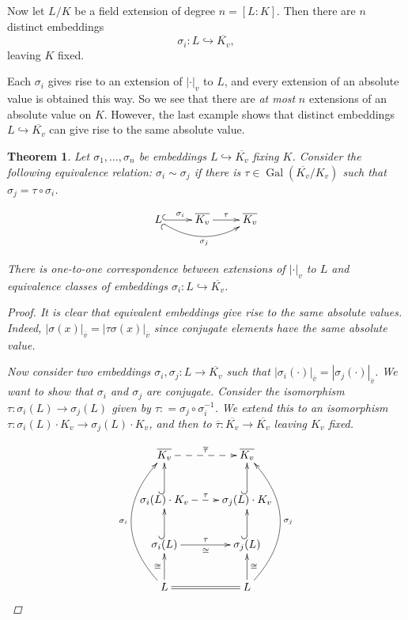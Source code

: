 \documentclass{article}
\newcommand{\isom}{\cong}
\newcommand{\dfn}{\mathrel{\mathop:}=}
\DeclareMathOperator{\Gal}{Gal}
\theoremstyle{myplain}
\newtheorem{theorem}[proposition]{Theorem}
\theoremstyle{mydefinition}
\begin{document}
Now let $L/K$ be a field extension of degree $n = [L:K]$. Then there are $n$
distinct embeddings
$$\sigma_i\colon L \hookrightarrow \overline{K_v},$$
leaving $K$ fixed.

Each $\sigma_i$ gives rise to an extension of $|\cdot|_v$ to $L$, and every
extension of an absolute value is obtained this way. So we see that there are
\emph{at most} $n$ extensions of an absolute value on $K$. However, the last
example shows that distinct embeddings $L \hookrightarrow \overline{K_v}$ can
give rise to the same absolute value.

\begin{theorem}
  Let $\sigma_1, \ldots, \sigma_n$ be embeddings
  $L \hookrightarrow \overline{K_v}$ fixing $K$. Consider the following
  equivalence relation: $\sigma_i \sim \sigma_j$ if there is
  $\tau \in \Gal (\overline{K_v}/K_v)$ such that $\sigma_j = \tau\circ\sigma_i$.

  \[ \xymatrix{
      L\ar@{^(->}[r]^{\sigma_i}\ar@{_(->}@/_1.5em/[rr]_{\sigma_j} & \overline{K_v}\ar[r]^{\tau} & \overline{K_v}
    } \]

  There is one-to-one correspondence between extensions of $|\cdot|_v$ to $L$
  and equivalence classes of embeddings
  $\sigma_i\colon L \hookrightarrow \overline{K_v}$.

  \begin{proof}
    It is clear that equivalent embeddings give rise to the same absolute
    values. Indeed,
    $|\sigma (x)|_{\overline{v}} = |\tau\sigma (x)|_{\overline{v}}$ since
    conjugate elements have the same absolute value.

    \vspace{1em}

    Now consider two embeddings $\sigma_i, \sigma_j\colon L\to \overline{K_v}$
    such that
    $|\sigma_i (\cdot)|_{\overline{v}} = |\sigma_j (\cdot)|_{\overline{v}}$. We
    want to show that $\sigma_i$ and $\sigma_j$ are conjugate. Consider the
    isomorphism $\tau\colon \sigma_i (L) \to \sigma_j (L)$ given by
    $\tau \dfn \sigma_j\circ \sigma_i^{-1}$. We extend this to an isomorphism
    $\tau\colon \sigma_i (L) \cdot K_v \to \sigma_j (L) \cdot K_v$, and then to
    $\overline{\tau}\colon \overline{K_v} \to \overline{K_v}$ leaving $K_v$
    fixed.

    \[ \xymatrix{
        \overline{K_v}\ar@{-->}[r]^{\overline{\tau}} & \overline{K_v} \\
        \sigma_i (L)\cdot K_v\ar@{-->}[r]^\tau\ar@{^(->}[u] & \sigma_j (L)\cdot K_v\ar@{^(->}[u] \\
        \sigma_i (L)\ar[r]^\tau_\isom\ar@{^(->}[u] & \sigma_j (L)\ar@{^(->}[u] \\
        L\ar[u]^\isom\ar@/^3em/[uuu]^{\sigma_i}\ar@{=}[r] & L\ar[u]_\isom\ar@/_3em/[uuu]_{\sigma_j}
      } \]


\end{proof}
\end{theorem}
\end{document}
